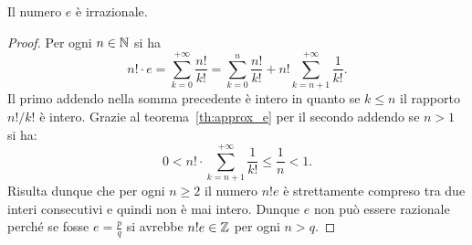 \begin{theorem}[irrazionalità di $e$]
%
%
\mymark{**}%
%
%
Il numero $e$ è irrazionale.
\end{theorem}
%
\begin{proof}
Per ogni $n\in {\mathbb N}$ si ha 
\[
  n! \cdot e = \sum_{k=0}^{+\infty} \frac{n!}{k!}
   = \sum_{k=0}^n \frac{n!}{k!} + n!\sum_{k=n+1}^{+\infty} \frac{1}{k!}.
\]
Il primo addendo nella somma precedente è intero
in quanto se $k\le n$ il rapporto $n!/k!$ è intero.
Grazie al teorema~\ref{th:approx_e}
per il secondo addendo se $n>1$ si ha:
\[
0 < n! \cdot \sum_{k=n+1}^{+\infty} \frac{1}{k!}
\le \frac{1}{n} < 1.
\]
Risulta dunque che per ogni $n\ge 2$ il numero $n! e$
è strettamente compreso tra due interi consecutivi e quindi non 
è mai intero. Dunque $e$ non può essere razionale perché 
se fosse $e=\frac p q$ si avrebbe $n! e \in {\mathbb Z}$ per ogni 
$n>q$.
\end{proof}

